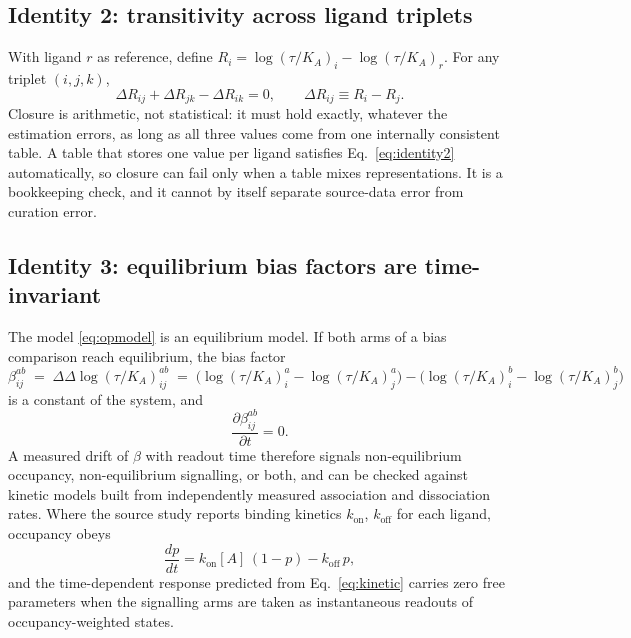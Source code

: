 ﻿\documentclass[11pt,a4paper]{article}
\newcommand{\logR}{\ensuremath{\log(\tau/K_{\!A})}}
\begin{document}
\subsection{Identity 2: transitivity across ligand triplets}
\label{sec:identity2}

With ligand $r$ as reference, define $R_i=\logR_i-\logR_r$. For any triplet $(i,j,k)$,
\begin{equation}
\Delta R_{ij}+\Delta R_{jk}-\Delta R_{ik}=0,
\qquad
\Delta R_{ij}\equiv R_i-R_j.
\label{eq:identity2}
\end{equation}
Closure is arithmetic, not statistical: it must hold exactly, whatever the estimation errors, as long as all three values come from one internally consistent table. A table that stores one value per ligand satisfies Eq.~\eqref{eq:identity2} automatically, so closure can fail only when a table mixes representations. It is a bookkeeping check, and it cannot by itself separate source-data error from curation error.

\subsection{Identity 3: equilibrium bias factors are time-invariant}

The model \eqref{eq:opmodel} is an equilibrium model. If both arms of a bias comparison reach equilibrium, the bias factor
\begin{equation}
\beta^{ab}_{ij} \;=\; \Delta\Delta\logR_{ij}^{ab}
\;=\;\big(\logR_i^{a}-\logR_j^{a}\big)-\big(\logR_i^{b}-\logR_j^{b}\big)
\label{eq:biasfactor}
\end{equation}
is a constant of the system, and
\begin{equation}
\frac{\partial \beta^{ab}_{ij}}{\partial t}=0.
\label{eq:identity3}
\end{equation}
A measured drift of $\beta$ with readout time therefore signals non-equilibrium occupancy, non-equilibrium signalling, or both, and can be checked against kinetic models built from independently measured association and dissociation rates. Where the source study reports binding kinetics $k_{\mathrm{on}}$, $k_{\mathrm{off}}$ for each ligand, occupancy obeys
\begin{equation}
\frac{dp}{dt}=k_{\mathrm{on}}[A]\,(1-p)-k_{\mathrm{off}}\,p,
\label{eq:kinetic}
\end{equation}
and the time-dependent response predicted from Eq.~\eqref{eq:kinetic} carries zero free parameters when the signalling arms are taken as instantaneous readouts of occupancy-weighted states.
\end{document}
